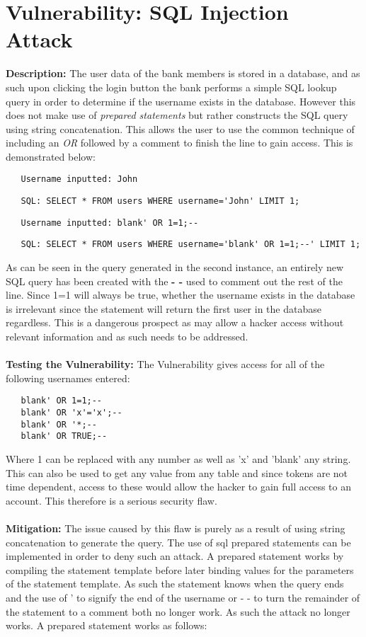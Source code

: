 \section{Vulnerability: SQL Injection Attack}
\label{sec:background}
\textbf{Description:} The user data of the bank members is stored in a database, and as such upon clicking the login button the bank performs a simple SQL lookup query in order to
determine if the username exists in the database. However this does not make use of \textit{prepared statements} but rather constructs the SQL query using string concatenation.
This allows the user to use the common technique of including an \textit{OR} followed by a comment to finish the line to gain access. This is demonstrated below:
\begin{verbatim}
   Username inputted: John
\end{verbatim}
\begin{verbatim}
   SQL: SELECT * FROM users WHERE username='John' LIMIT 1;
\end{verbatim}
\begin{verbatim}
   Username inputted: blank' OR 1=1;--
\end{verbatim}
\begin{verbatim}
   SQL: SELECT * FROM users WHERE username='blank' OR 1=1;--' LIMIT 1;
\end{verbatim}
As can be seen in the query generated in the second instance, an entirely new SQL query has been created with the \textbf{- -} used to comment out the rest of the line.
Since 1=1 will always be true, whether the username exists in the database is irrelevant since the statement will return the first user in the database regardless. This is a dangerous
prospect as may allow a hacker access without relevant information and as such needs to be addressed.\\ \\
\textbf{Testing the Vulnerability:} The Vulnerability gives access for all of the following usernames entered:
 
\begin{verbatim}
   blank' OR 1=1;--
   blank' OR 'x'='x';--
   blank' OR '*;--
   blank' OR TRUE;--
\end{verbatim}
Where 1 can be replaced with any number as well as 'x' and 'blank' any string. This can also be used to get any value from any table and since tokens are not time dependent, access
to these would allow the hacker to gain full access to an account. This therefore is a serious security flaw.\\ \\
\textbf{Mitigation:} The issue caused by this flaw is purely as a result of using string concatenation to generate the query. The use of sql prepared statements can be implemented in order
to deny such an attack. A prepared statement works by compiling the statement template before later binding values for the parameters of the statement template. As such the statement knows
when the query ends and  the use of ' to signify the end of the username or - - to turn the remainder of the statement to a comment both no longer work. As such the attack no longer works. A
prepared statement works as follows:\\
 
